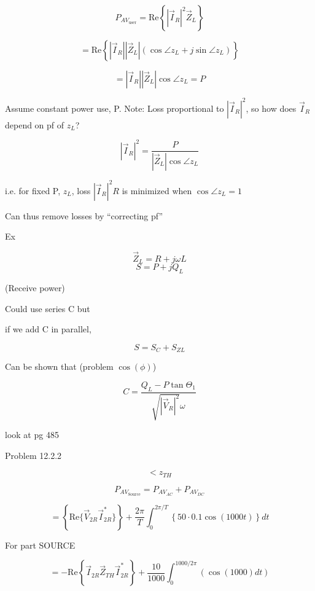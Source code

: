 \[
P_{AV_{\text{user}}} = \text{Re}\left\{ |\vec{I}_R|^2 \vec{Z}_L \right\}
\]

\[
= \text{Re}\left\{ |\vec{I}_R| |\vec{Z}_L| (\cos \angle z_L + j \sin \angle z_L) \right\}
\]

\[
= |\vec{I}_R| |\vec{Z}_L| \cos \angle z_L = P
\]

\noindent Assume constant power use, P. Note: Loss proportional to $|\vec{I}_R|^2$, so how does $\vec{I}_R$ depend on pf of $z_L$?

\[
|\vec{I}_R|^2 = \frac{P}{|\vec{Z}_L| \cos \angle z_L}
\]

\noindent i.e. for fixed P, $z_L$, loss $|\vec{I}_R|^2 R$ is minimized when $\cos \angle z_L = 1$


\noindent Can thus remove losses by ``correcting pf''

Ex


\[
\vec{Z}_L = R + j\omega L
\]
\[
S = P + jQ_L
\]

(Receive power)


\noindent Could use series C but

if we add C in parallel,

\[
S = S_C + S_{ZL}
\]


\noindent Can be shown that (problem $\cos(\phi)$)

\[
C = \frac{Q_L - P \tan \Theta_1}{\sqrt{|\vec{V}_R|^2} \omega}
\]

\hspace{4cm} look at pg 485


\noindent Problem 12.2.2


\[
< z_{TH}
\]

\[
P_{AV_{\text{Source}}} = P_{AV_{AC}} + P_{AV_{DC}}
\]
%
%

\[
= \left\{ \text{Re}\{\vec{V}_{2R} \vec{I}_{2R}^*\} \right\} + \frac{2\pi}{T} \int_0^{2\pi/T} \left\{ 50 \cdot 0.1 \cos(1000t) \right\} dt
\]

\noindent For part SOURCE

\[
= -\text{Re}\left\{ \vec{I}_{2R} \vec{Z}_{TH} \vec{I}_{2R}^* \right\} + \frac{10}{1000} \int_0^{1000/2\pi} \left( \cos(1000)dt \right)
\]

